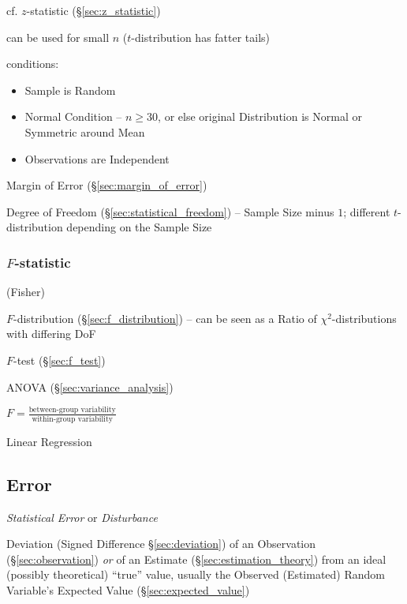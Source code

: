 cf. $z$-statistic (\S\ref{sec:z_statistic})

can be used for small $n$ ($t$-distribution has fatter tails)

conditions:
\begin{itemize}
  \item Sample is Random
  \item Normal Condition -- $n \geq 30$, or else original Distribution is Normal
    or Symmetric around Mean
  \item Observations are Independent
\end{itemize}

Margin of Error (\S\ref{sec:margin_of_error})

Degree of Freedom (\S\ref{sec:statistical_freedom}) -- Sample Size minus $1$;
different $t$-distribution depending on the Sample Size



\subsubsection{$F$-statistic}\label{sec:f_statistic}

(Fisher)

$F$-distribution (\S\ref{sec:f_distribution}) -- can be seen as a Ratio of
$\chi^2$-distributions with differing DoF

$F$-test (\S\ref{sec:f_test})

ANOVA (\S\ref{sec:variance_analysis})

$F = \frac{\text{between-group variability}}{\text{within-group variability}}$

Linear Regression



\subsection{Error}\label{sec:error}

\emph{Statistical Error} or \emph{Disturbance}

Deviation (Signed Difference \S\ref{sec:deviation}) of an Observation
(\S\ref{sec:observation}) \emph{or} of an Estimate
(\S\ref{sec:estimation_theory}) from an ideal (possibly theoretical) ``true''
value, usually the Observed (Estimated) Random Variable's Expected Value
(\S\ref{sec:expected_value})


